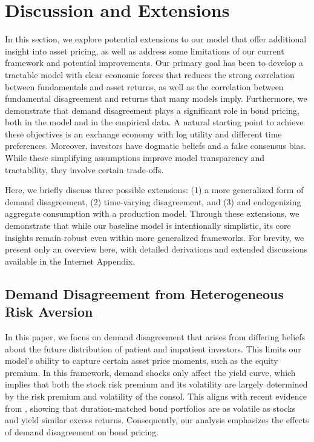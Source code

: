 \documentclass[preprint,11pt,authoryear]{elsarticle}
\theoremstyle{plain}
\begin{document}
 
\section{Discussion and Extensions}\label{sec:Extensions}

In this section, we explore potential extensions to our model that offer additional insight into asset pricing, as well as address some limitations of our current framework and potential improvements. Our primary goal has been to develop a tractable model with clear economic forces that reduces the strong correlation between fundamentals and asset returns, as well as the correlation between fundamental disagreement and returns that many models imply. Furthermore, we demonstrate that demand disagreement plays a significant role in bond pricing, both in the model and in the empirical data. A natural starting point to achieve these objectives is an exchange economy with log utility and different time preferences.  Moreover, investors have dogmatic beliefs and a false consensus bias. While these simplifying assumptions improve model transparency and tractability, they involve certain trade-offs.

Here, we briefly discuss three possible extensions: (1) a more generalized form of demand disagreement, (2) time-varying disagreement, and (3) and endogenizing aggregate consumption with a production model. Through these extensions, we demonstrate that while our baseline model is intentionally simplistic, its core insights remain robust even within more generalized frameworks. For brevity, we present only an overview here, with detailed derivations and extended discussions available in the Internet Appendix.


 
\subsection{Demand Disagreement from Heterogeneous Risk Aversion} \label{sec:GeneralDD}

In this paper, we focus on demand disagreement that arises from differing beliefs about the future distribution of patient and impatient investors. This limits our model's ability to capture certain asset price moments, such as the equity premium. %
In this framework, demand shocks only affect the yield curve, which implies that both the stock risk premium and its volatility are largely determined by the risk premium and volatility of the consol. This aligns with recent evidence from \cite{JVB:2021}, showing that duration-matched bond portfolios are as volatile as stocks and yield similar excess returns. Consequently, our analysis emphasizes the effects of demand disagreement on bond pricing.
\end{document}
